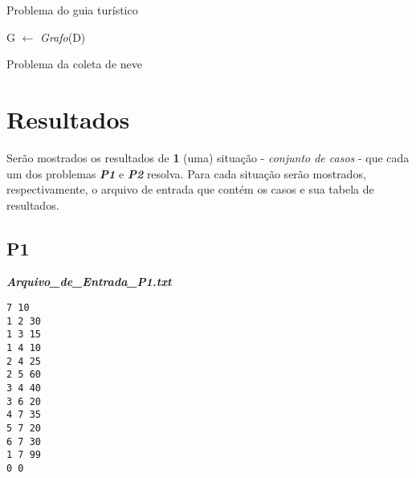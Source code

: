 \documentclass{article}
\begin{document}
\begin{algorithm}
\caption{Problema do guia turístico}
\begin{algorithmic}[1]

    \State G $\gets$ \textit{Grafo}(D)
\EndWhile
{}
        \Else
        \EndIf
      \EndFor
    \EndWhile
\EndFunction
\end{algorithmic}
\end{algorithm}

\begin{algorithm}
\caption{Problema da coleta de neve}
\begin{algorithmic}[1]

\end{algorithmic}
\end{algorithm}

\section{Resultados}
    Serão mostrados os resultados de \textbf{1} (uma) situação - \textit{conjunto de casos} - que cada um dos problemas \textbf{\textit{P1}} e \textbf{\textit{P2}} resolva. Para cada situação serão mostrados, respectivamente, o arquivo de entrada que contém os casos e sua tabela de resultados.
\subsection{P1}
\begin{center} \textbf{\textit{Arquivo\_de\_Entrada\_P1.txt}} \end{center}
       \begin{lstlisting} 
7 10
1 2 30
1 3 15
1 4 10
2 4 25
2 5 60
3 4 40
3 6 20
4 7 35
5 7 20
6 7 30
1 7 99
0 0

        
\end{lstlisting}
\end{document}
